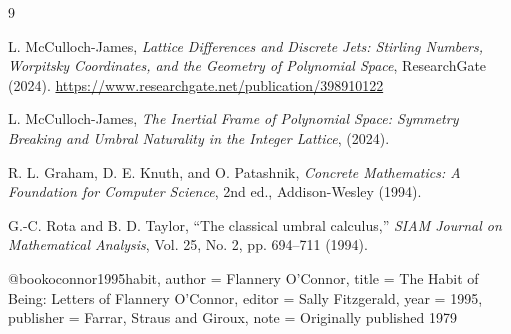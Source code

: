 \documentclass[a5paper,11pt,twoside,onecolumn,openany,extrafontsizes,final]{memoir}%
\begin{document}







%

% 







\newpage\phantom{blabla}
\pagestyle{empty}


\begin{thebibliography}{9}

L. McCulloch-James, \emph{Lattice Differences and Discrete Jets: Stirling Numbers, Worpitsky Coordinates, and the Geometry of Polynomial Space}, ResearchGate (2024). \url{https://www.researchgate.net/publication/398910122}

L. McCulloch-James, \emph{The Inertial Frame of Polynomial Space: Symmetry Breaking and Umbral Naturality in the Integer Lattice}, (2024).

R. L. Graham, D. E. Knuth, and O. Patashnik, \emph{Concrete Mathematics: A Foundation for Computer Science}, 2nd ed., Addison-Wesley (1994).

G.-C. Rota and B. D. Taylor, ``The classical umbral calculus,'' \emph{SIAM Journal on Mathematical Analysis}, Vol. 25, No. 2, pp. 694--711 (1994).

\end{thebibliography}

@book{oconnor1995habit,
  author    = {Flannery O'Connor},
  title     = {The Habit of Being: Letters of Flannery O'Connor},
  editor    = {Sally Fitzgerald},
  year      = {1995},
  publisher = {Farrar, Straus and Giroux},
  note      = {Originally published 1979}}
\end{document}
